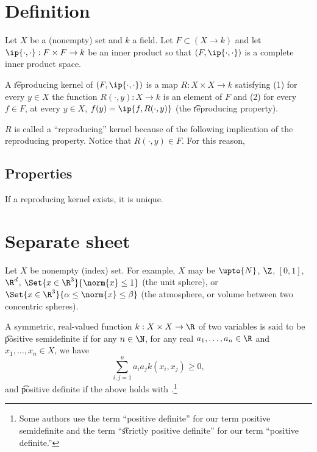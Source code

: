 

  \section*{Definition}

Let $X$ be a (nonempty) set and $k$ a field.
Let $F \subset (X \to k)$ and let $\ip{\cdot , \cdot }: F \times F \to k$ be an inner product so that $(F, \ip{\cdot ,\cdot })$ is a complete inner product space.

A \t{reproducing kernel} of $(F, \ip{\cdot ,\cdot })$ is a map $R: X \times X \to k$ satisfying (1) for every $y \in X$ the function $R(\cdot , y): X \to k$ is an element of $F$ and (2) for every $f \in F$, at every $y \in X$, $f(y) = \ip{f, R(\cdot , y)}$ (the \t{reproducing property}).

$R$ is called a ``reproducing'' kernel because of the following implication of the reproducing property.
Notice that $R(\cdot , y) \in F$.
For this reason,

\subsection*{Properties}

If a reproducing kernel exists, it is unique.

\section*{Separate sheet}

Let $X$ be nonempty (index) set.
For example, $X$ may be $\upto{N}$, $\Z $, $[0, 1]$, $\R ^d$, $\Set{x \in \R ^3}{\norm{x} \leq 1}$ (the unit sphere), or $\Set{x \in \R ^3}{\alpha  \leq \norm{x} \leq \beta }$ (the atmosphere, or volume between two concentric spheres).

A symmetric, real-valued function $k: X \times X \to \R $ of two variables is said to be \t{positive semidefinite} if for any $n \in \N  $, for any real $a_1, \dots , a_n \in \R $ and $x_1, \dots , x_n \in X$, we have
\[
\sum_{i, j = 1}^{n} a_ia_j k(x_i, x_j) \geq 0,
\]
and \t{positive definite} if the above holds with \say{$>$}.\footnote{Some authors use the term ``positive definite'' for our term positive semidefinite and the term ``\t{strictly positive definite}'' for our term ``positive definite.''}

